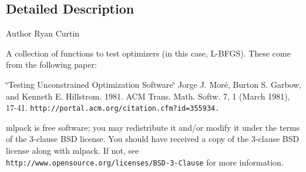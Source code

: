 \subsection{Detailed Description}
\begin{DoxyAuthor}{Author}
Ryan Curtin
\end{DoxyAuthor}
A collection of functions to test optimizers (in this case, L-\/\+B\+F\+GS). These come from the following paper\+:

\char`\"{}\+Testing Unconstrained Optimization Software\char`\"{} Jorge J. Moré, Burton S. Garbow, and Kenneth E. Hillstrom. 1981. A\+CM Trans. Math. Softw. 7, 1 (March 1981), 17-\/41. {\tt http\+://portal.\+acm.\+org/citation.\+cfm?id=355934.}

mlpack is free software; you may redistribute it and/or modify it under the terms of the 3-\/clause B\+SD license. You should have received a copy of the 3-\/clause B\+SD license along with mlpack. If not, see {\tt http\+://www.\+opensource.\+org/licenses/\+B\+S\+D-\/3-\/\+Clause} for more information. 